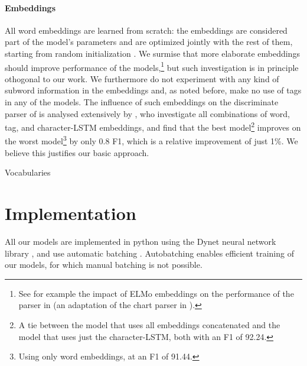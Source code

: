 \paragraph{Embeddings}
All word embeddings are learned from scratch: the embeddings are considered part of the model's parameters and are optimized jointly with the rest of them, starting from random initialization \citep{glorot2010understanding}. We surmise that more elaborate embeddings should improve performance of the models,\footnote{See for example the impact of ELMo embeddings \citep{peters2018elmo} on the performance of the parser in \citet{kitaev2018attentive} (an adaptation of the chart parser in \citet{stern2017minimal}).} but such investigation is in principle othogonal to our work. We furthermore do not experiment with any kind of subword information in the embeddings and, as noted before, make no use of tags in any of the models. The influence of such embeddings on the discriminate parser of \citet{stern2017minimal} is analysed extensively by \citet{stern2018analyis}, who investigate all combinations of word, tag, and character-LSTM embeddings, and find that the best model\footnote{A tie between the model that uses all embeddings concatenated and the model that uses just the character-LSTM, both with an F1 of 92.24.} improves on the worst model\footnote{Using only word embeddings, at an F1 of 91.44.} by only 0.8 F1, which is a relative improvement of just 1\%. We believe this justifies our basic approach.

\begin{table}
  \caption{Vocabularies}
  \label{tab:vocabularies}
\end{table}


\section{Implementation}
All our models are implemented in python using the Dynet neural network library \citep{neubig2017dynet}, and use automatic batching \citep{neubig2017fly}. Autobatching enables efficient training of our models, for which manual batching is not possible.

